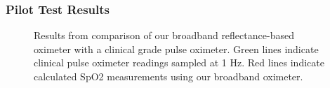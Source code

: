 \subsubsection{Pilot Test Results}
\begin{figure}
    \begin{center}
    \end{center}
    \caption{Results from comparison of our broadband reflectance-based oximeter with a clinical grade pulse oximeter. Green lines indicate clinical pulse oximeter readings sampled at 1 Hz. Red lines indicate calculated SpO2 measurements using our broadband oximeter. } 
    \label{fig:D3results}
\end{figure} 
